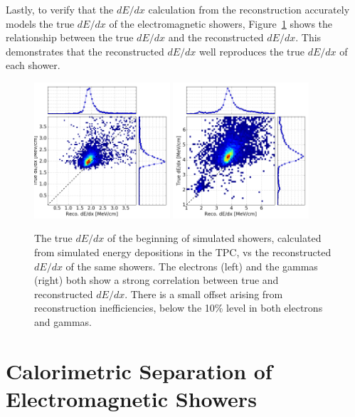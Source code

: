 Lastly, to verify that the $dE/dx$ calculation from the reconstruction accurately models the true $dE/dx$ of the electromagnetic showers, Figure~\ref{fig:true_dedx} shows the relationship between the true $dE/dx$ and the reconstructed $dE/dx$.  This demonstrates that the reconstructed $dE/dx$ well reproduces the true $dE/dx$ of each shower.

\begin{figure}[htb]
  \centering
  \includegraphics[width=0.45\textwidth]{emshower_figures/e_true_reco_dedx_4cm.png}
  \includegraphics[width=0.45\textwidth]{emshower_figures/p_true_reco_dedx_4cm.png}
  \caption{The true $dE/dx$ of the beginning of simulated showers, calculated from simulated energy depositions in the TPC, vs the reconstructed $dE/dx$ of the same showers.  The electrons (left) and the gammas (right) both show a strong correlation between true and reconstructed $dE/dx$. There is a small offset arising from reconstruction inefficiencies, below the 10\% level in both electrons and gammas.}
  \label{fig:true_dedx}
\end{figure}

\section{\label{sec:argo_dedx} Calorimetric Separation of Electromagnetic Showers}

